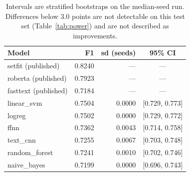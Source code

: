 \begin{table}[htbp]
\centering
\caption{Cross-repository F1. Our models are the mean of five seeds.}
\label{tab:main}
\begin{tabular}{lrrc}
\toprule
Model & F1 & sd (seeds) & 95\% CI \\
\midrule
setfit (published) & 0.8240 & --- & --- \\
roberta (published) & 0.7923 & --- & --- \\
fasttext (published) & 0.7184 & --- & --- \\
\midrule
linear\_svm & 0.7504 & 0.0000 & [0.729, 0.773] \\
logreg & 0.7502 & 0.0000 & [0.729, 0.772] \\
ffnn & 0.7362 & 0.0043 & [0.714, 0.758] \\
text\_cnn & 0.7255 & 0.0067 & [0.703, 0.748] \\
random\_forest & 0.7241 & 0.0010 & [0.702, 0.746] \\
naive\_bayes & 0.7199 & 0.0000 & [0.696, 0.743] \\
\bottomrule
\end{tabular}
\caption*{\footnotesize Intervals are stratified bootstraps on the median-seed run. Differences below 3.0 points are not detectable on this test set (Table~\ref{tab:power}) and are not described as improvements.}
\end{table}
